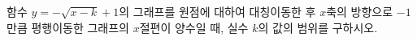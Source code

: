 \hspace*{2mm}\begin{minipage}[t]{\dimexpr\linewidth-2mm\relax}\vspace{0pt}
함수 $y=-\sqrt{x-k}+1$의 그래프를 원점에 대하여 대칭이동한 후 $x$축의 방향으로 $-1$만큼 평행이동한 그래프의 $x$절편이 양수일 때, 실수 $k$의 값의 범위를 구하시오.\end{minipage}
